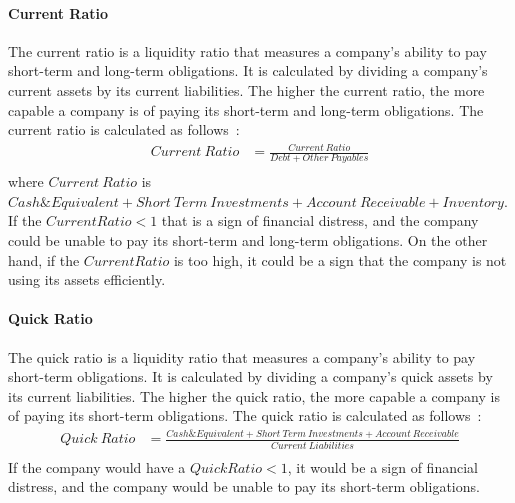 \documentclass[../xlapes02]{subfiles}
\begin{document}
    \paragraph{Current Ratio}\label{par:current-ratio}
    The current ratio is a liquidity ratio that measures a company's ability to pay short-term and long-term obligations. It is calculated by dividing a company's current assets by its current liabilities. The higher the current ratio, the more capable a company is of paying its short-term and long-term obligations. The current ratio is calculated as follows~\cite{investopedia-current-ratio}:
    \begin{equation}
        \begin{split}
            Current\ Ratio&=\frac{Current\ Ratio}{Debt+Other\ Payables}\\
        \end{split}
    \end{equation}
    where $Current\ Ratio$ is $Cash\&Equivalent+Short\ Term\ Investments+Account\ Receivable+Inventory$. If the $Current Ratio < 1$ that is a sign of financial distress, and the company could be unable to pay its short-term and long-term obligations. On the other hand, if the $Current Ratio$ is too high, it could be a sign that the company is not using its assets efficiently.

    \paragraph{Quick Ratio}\label{par:quick-ratio}
    The quick ratio is a liquidity ratio that measures a company's ability to pay short-term obligations. It is calculated by dividing a company's quick assets by its current liabilities. The higher the quick ratio, the more capable a company is of paying its short-term obligations. The quick ratio is calculated as follows~\cite{investopedia-quick-ratio}:
    \begin{equation}
        \begin{split}
            Quick\ Ratio&=\frac{Cash\&Equivalent+Short\ Term\ Investments+Account\ Receivable}{Current\ Liabilities}\\
        \end{split}
    \end{equation}
    If the company would have a $Quick Ratio < 1$, it would be a sign of financial distress, and the company would be unable to pay its short-term obligations.
\end{document}
